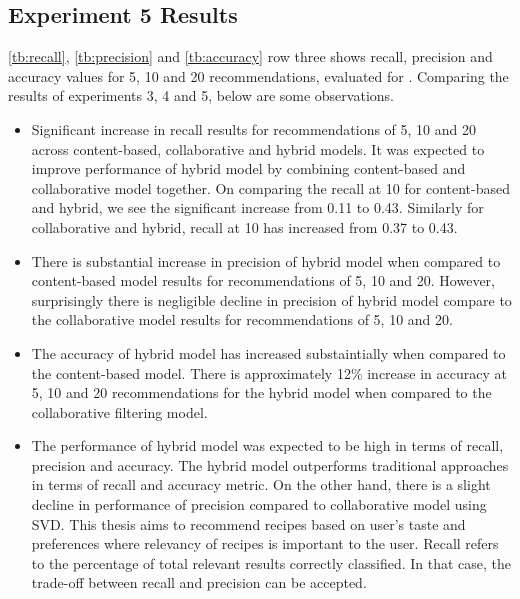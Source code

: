 \subsection{Experiment 5 Results}
\label{sec:res5}
\autoref{tb:recall}, \autoref{tb:precision} and \autoref{tb:accuracy} row three shows recall, precision and accuracy values for 5, 10 and 20 recommendations, evaluated for . Comparing the results of experiments 3, 4 and 5, below are some observations.
\begin{itemize}
\item Significant increase in recall results for recommendations of 5, 10 and 20 across content-based, collaborative and hybrid models. It was expected to improve performance of hybrid model by combining content-based and collaborative model together. On comparing the recall at 10 for content-based and hybrid, we see the significant increase from 0.11 to 0.43. Similarly for collaborative and hybrid, recall at 10 has increased from 0.37 to 0.43. 
\item There is substantial increase in precision of hybrid model when compared to content-based model results for recommendations of 5, 10 and 20. However, surprisingly there is negligible decline in precision of hybrid model compare to the collaborative model results for recommendations of 5, 10 and 20.
\item The accuracy of hybrid model has increased substaintially when compared to the content-based model. There is approximately 12\% increase in accuracy at 5, 10 and 20 recommendations for the hybrid model when compared to the collaborative filtering model. 
\item The performance of hybrid model was expected to be high in terms of recall, precision and accuracy. The hybrid model outperforms traditional approaches in terms of recall and accuracy metric. On the other hand, there is a slight decline in performance of precision compared to collaborative model using SVD. This thesis aims to recommend recipes based on user's taste and preferences where relevancy of recipes is important to the user. Recall refers to the percentage of total relevant results correctly classified. In that case, the trade-off between recall and precision can be accepted. 
\end{itemize}

